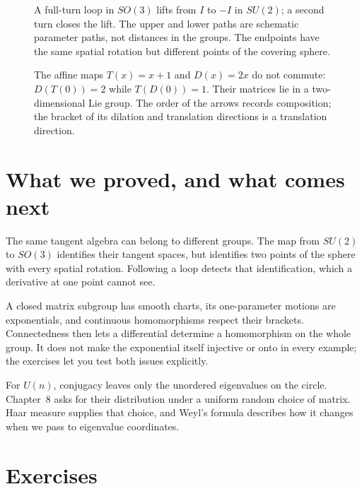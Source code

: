 \begin{figure}[ht]
\centering
{}
\caption{A full-turn loop in $SO(3)$ lifts from $I$ to $-I$ in $SU(2)$; a second turn closes the lift. The upper and lower paths are schematic parameter paths, not distances in the groups. The endpoints have the same spatial rotation but different points of the covering sphere.}
\label{fig:v9-spin-lift}
\end{figure}
\begin{figure}[ht]
\centering
{}
\caption{The affine maps $T(x)=x+1$ and $D(x)=2x$ do not commute: $D(T(0))=2$ while $T(D(0))=1$. Their matrices lie in a two-dimensional Lie group. The order of the arrows records composition; the bracket of its dilation and translation directions is a translation direction.}
\label{fig:v9-affine-product}
\end{figure}

\section{What we proved, and what comes next}

The same tangent algebra can belong to different groups.
The map from $SU(2)$ to $SO(3)$ identifies their tangent spaces, but
identifies two points of the sphere with every spatial rotation.
Following a loop detects that identification, which a derivative at one
point cannot see.

A closed matrix subgroup has smooth charts, its one-parameter motions
are exponentials, and continuous homomorphisms respect their brackets.
Connectedness then lets a differential determine a homomorphism on the
whole group. It does not make the exponential itself injective or onto
in every example; the exercises let you test both issues explicitly.

For $U(n)$, conjugacy leaves only the unordered eigenvalues on the circle.
Chapter~8 asks for their distribution under a uniform random choice of
matrix. Haar measure supplies that choice, and Weyl's formula describes
how it changes when we pass to eigenvalue coordinates.

\section{Exercises}

